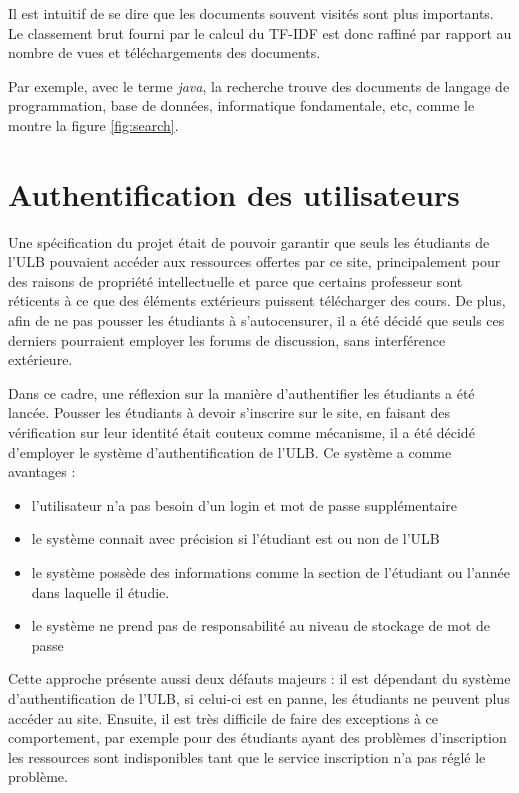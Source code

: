 \documentclass[a4paper,12pt]{article}
\begin{document}
Il est intuitif de se dire que les documents souvent visités sont
plus importants. Le classement brut fourni par le calcul du TF-IDF est donc raffiné
par rapport au nombre de vues et téléchargements des documents.

Par exemple, avec le terme \textit{java}, la recherche trouve des documents de langage
de programmation, base de données, informatique fondamentale, etc, comme le montre la figure
\ref{fig:search}.


\section{Authentification des utilisateurs}

Une spécification du projet était de pouvoir garantir que seuls les étudiants de l'ULB
pouvaient accéder aux ressources offertes par ce site, principalement pour des raisons
de propriété intellectuelle et parce que certains professeur sont réticents à 
ce que des éléments extérieurs puissent télécharger des cours. De plus, afin
de ne pas pousser les étudiants à s'autocensurer, il a été décidé que seuls ces derniers
pourraient employer les forums de discussion, sans interférence extérieure.

Dans ce cadre, une réflexion sur la manière d'authentifier les étudiants
a été lancée. Pousser les étudiants à devoir s'inscrire sur le site, en faisant des
vérification sur leur identité était couteux comme mécanisme, il a été décidé
d'employer le système d'authentification de l'ULB. Ce système a comme avantages :
\begin{itemize}
\item l'utilisateur n'a pas besoin d'un login et mot de passe supplémentaire
\item le système connait avec précision si l'étudiant est ou non de l'ULB
\item le système possède des informations comme la section de l'étudiant ou
      l'année dans laquelle il étudie.
\item le système ne prend pas de responsabilité au niveau de stockage de mot de passe
\end{itemize}

Cette approche présente aussi deux défauts majeurs : il est dépendant du système
d'authentification de l'ULB, si celui-ci est en panne, les étudiants ne peuvent plus
accéder au site. Ensuite, il est très difficile de faire des exceptions à ce comportement,
par exemple pour des étudiants ayant des problèmes d'inscription les ressources
sont indisponibles tant que le service inscription n'a pas réglé le problème.
\end{document}
